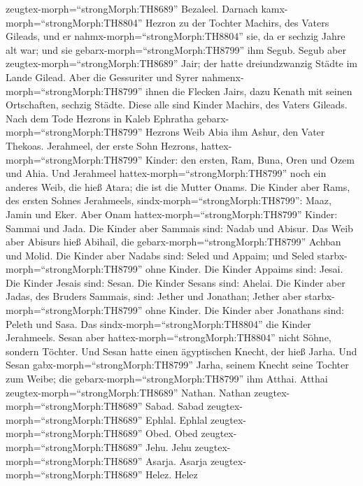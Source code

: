 zeugtex-morph=``strongMorph:TH8689'' Bezaleel.  Darnach
kamx-morph=``strongMorph:TH8804'' Hezron zu der Tochter Machirs, des
Vaters Gileads, und er nahmx-morph=``strongMorph:TH8804'' sie, da er
sechzig Jahre alt war; und sie gebarx-morph=``strongMorph:TH8799'' ihm
Segub.  Segub aber zeugtex-morph=``strongMorph:TH8689''
Jair; der hatte dreiundzwanzig Städte im Lande Gilead. 
Aber die Gessuriter und Syrer nahmenx-morph=``strongMorph:TH8799'' ihnen
die Flecken Jairs, dazu Kenath mit seinen Ortschaften, sechzig Städte.
Diese alle sind Kinder Machirs, des Vaters Gileads.  Nach
dem Tode Hezrons in Kaleb Ephratha gebarx-morph=``strongMorph:TH8799''
Hezrons Weib Abia ihm Ashur, den Vater Thekoas.  Jerahmeel,
der erste Sohn Hezrons, hattex-morph=``strongMorph:TH8799'' Kinder: den
ersten, Ram, Buna, Oren und Ozem und Ahia.  Und Jerahmeel
hattex-morph=``strongMorph:TH8799'' noch ein anderes Weib, die hieß
Atara; die ist die Mutter Onams.  Die Kinder aber Rams, des
ersten Sohnes Jerahmeels, sindx-morph=``strongMorph:TH8799'': Maaz,
Jamin und Eker.  Aber Onam
hattex-morph=``strongMorph:TH8799'' Kinder: Sammai und Jada. Die Kinder
aber Sammais sind: Nadab und Abisur.  Das Weib aber Abisurs
hieß Abihail, die gebarx-morph=``strongMorph:TH8799'' Achban und Molid.
 Die Kinder aber Nadabs sind: Seled und Appaim; und Seled
starbx-morph=``strongMorph:TH8799'' ohne Kinder.  Die
Kinder Appaims sind: Jesai. Die Kinder Jesais sind: Sesan. Die Kinder
Sesans sind: Ahelai.  Die Kinder aber Jadas, des Bruders
Sammais, sind: Jether und Jonathan; Jether aber
starbx-morph=``strongMorph:TH8799'' ohne Kinder.  Die
Kinder aber Jonathans sind: Peleth und Sasa. Das
sindx-morph=``strongMorph:TH8804'' die Kinder Jerahmeels. 
Sesan aber hattex-morph=``strongMorph:TH8804'' nicht Söhne, sondern
Töchter. Und Sesan hatte einen ägyptischen Knecht, der hieß Jarha.
 Und Sesan gabx-morph=``strongMorph:TH8799'' Jarha, seinem
Knecht seine Tochter zum Weibe; die gebarx-morph=``strongMorph:TH8799''
ihm Atthai.  Atthai zeugtex-morph=``strongMorph:TH8689''
Nathan. Nathan zeugtex-morph=``strongMorph:TH8689'' Sabad. 
Sabad zeugtex-morph=``strongMorph:TH8689'' Ephlal. Ephlal
zeugtex-morph=``strongMorph:TH8689'' Obed.  Obed
zeugtex-morph=``strongMorph:TH8689'' Jehu. Jehu
zeugtex-morph=``strongMorph:TH8689'' Asarja.  Asarja
zeugtex-morph=``strongMorph:TH8689'' Helez. Helez
